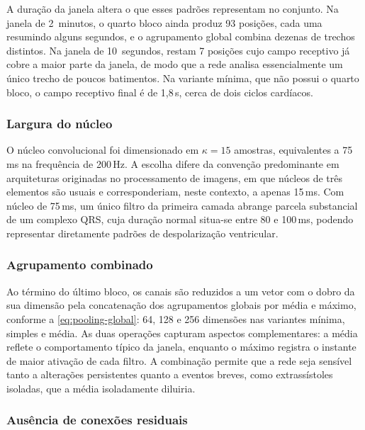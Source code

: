 A duração da janela altera o que esses padrões representam no conjunto.
Na janela de 2~minutos, o quarto bloco ainda produz 93 posições, cada uma
resumindo alguns segundos, e o agrupamento global combina dezenas de trechos
distintos. Na janela de 10~segundos, restam 7 posições cujo campo receptivo
já cobre a maior parte da janela, de modo que a rede analisa essencialmente
um único trecho de poucos batimentos. Na variante mínima, que não possui o
quarto bloco, o campo receptivo final é de 1,8\,s, cerca de dois ciclos
cardíacos.

\subsubsection{Largura do núcleo}
\label{subsubsec:fund-cnn-nucleo}

O núcleo convolucional foi dimensionado em $\kappa = 15$ amostras,
equivalentes a 75\,ms na frequência de 200\,Hz. A escolha difere da convenção
predominante em arquiteturas originadas no processamento de imagens, em que
núcleos de três elementos são usuais e corresponderiam, neste contexto, a
apenas 15\,ms. Com núcleo de 75\,ms, um único filtro da primeira camada
abrange parcela substancial de um complexo QRS, cuja duração normal situa-se
entre 80 e 100\,ms, podendo representar diretamente padrões de despolarização
ventricular.

\subsubsection{Agrupamento combinado}
\label{subsubsec:fund-cnn-pooling}

Ao término do último bloco, os canais são reduzidos a um vetor com o dobro
da sua dimensão pela concatenação dos agrupamentos globais por média e
máximo, conforme a \autoref{eq:pooling-global}: 64, 128 e 256 dimensões nas
variantes mínima, simples e média. As duas operações capturam aspectos
complementares: a média reflete o comportamento típico da janela, enquanto o
máximo registra o instante de maior ativação de cada filtro. A combinação
permite que a rede seja sensível tanto a alterações persistentes quanto a
eventos breves, como extrassístoles isoladas, que a média isoladamente
diluiria.

\subsubsection{Ausência de conexões residuais}
\label{subsubsec:fund-cnn-residual}

